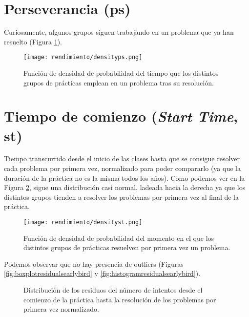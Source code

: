 \section{Perseverancia (ps)}

Curiosamente, algunos grupos siguen trabajando en un problema que ya han resuelto (Figura \ref{fig:densityplotps}).

\begin{figure}[H]
    \centering
    \texttt{[image: rendimiento/densityps.png]}
    \caption{Función de densidad de probabilidad del tiempo que los distintos grupos de prácticas emplean en un problema tras su resolución.}
    \label{fig:densityplotps}
\end{figure}

\section{Tiempo de comienzo (\emph{Start Time}, st)}

Tiempo transcurrido desde el inicio de las clases hasta que se consigue resolver cada problema por primera vez, normalizado para poder compararlo (ya que la duración de la práctica no es la misma todos los años). Como podemos ver en la Figura \ref{fig:densityplotearlybird}, sigue una distribución casi normal, ladeada hacia la derecha ya que los distintos grupos tienden a resolver los problemas por primera vez al final de la práctica.

\begin{figure}[H]
    \centering
    \texttt{[image: rendimiento/densityst.png]}
    \caption{Función de densidad de probabilidad del momento en el que los distintos grupos de prácticas resuelven por primera vez un problema.}
    \label{fig:densityplotearlybird}
\end{figure}

Podemos observar que no hay presencia de outliers (Figuras \ref{fig:boxplotresidualsearlybird} y \ref{fig:histogramresidualsearlybird}).

\begin{figure}[H]
\centering
{}\qquad
{}
\caption{Distribución de los residuos del número de intentos desde el comienzo de la práctica hasta la resolución de los problemas por primera vez normalizado.}
\label{fig:earlybird}
\end{figure}


